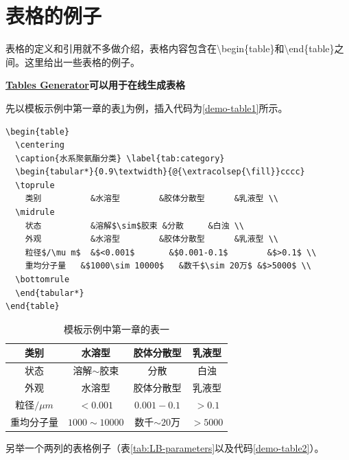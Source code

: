 \section{表格的例子}
\label{sec:tab}

表格的定义和引用就不多做介绍，表格内容包含在\textbackslash begin\{table\}和\textbackslash end\{table\}之间。这里给出一些表格的例子。

\textbf{\href{https://www.tablesgenerator.com/}{Tables Generator}可以用于在线生成表格}

先以模板示例中第一章的表\ref{tab:category}为例，插入代码为\ref{demo-table1}所示。

\begin{lstlisting}[language={[LaTeX]TeX}, caption={示例插表代码}, label=demo-table1]
\begin{table}
  \centering
  \caption{水系聚氨酯分类} \label{tab:category}
  \begin{tabular*}{0.9\textwidth}{@{\extracolsep{\fill}}cccc}
  \toprule
    类别			&水溶型		&胶体分散型		&乳液型 \\
  \midrule
    状态			&溶解$\sim$胶束	&分散		&白浊 \\
    外观			&水溶型		&胶体分散型		&乳液型 \\
    粒径$/\mu m$	&$<0.001$		&$0.001-0.1$		&$>0.1$ \\
    重均分子量	&$1000\sim 10000$	&数千$\sim 20万$ &$>5000$ \\
  \bottomrule
  \end{tabular*}
\end{table}
\end{lstlisting}

\begin{table}
  \centering
  \caption{模板示例中第一章的表一} \label{tab:category}
  \begin{tabular*}{0.9\textwidth}{@{\extracolsep{\fill}}cccc}
  \toprule
    类别			&水溶型		&胶体分散型		&乳液型 \\
  \midrule
    状态			&溶解$\sim$胶束	&分散		&白浊 \\
    外观			&水溶型		&胶体分散型		&乳液型 \\
    粒径$/\mu m$	&$<0.001$		&$0.001-0.1$		&$>0.1$ \\
    重均分子量	&$1000\sim 10000$	&数千$\sim 20$万 &$>5000$ \\
  \bottomrule
  \end{tabular*}
\end{table}

另举一个两列的表格例子（表\ref{tab:LB-parameters}以及代码\ref{demo-table2}）。

